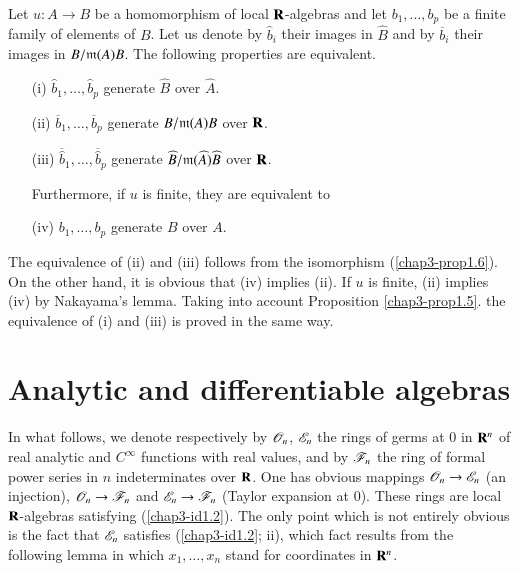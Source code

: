 \begin{corollary}\label{chap3-coro1.8}
Let $u:A\to B$ be a homomorphism of local $\mathbf{R}$-algebras and let $b_{1},\ldots,b_{p}$ be a finite family of elements of $B$. Let us denote by $\widehat{b}_{i}$ their images in $\widehat{B}$ and by $\overline{b}_{i}$ their images in $B/\mathfrak{m}(A)B$. The following properties are equivalent.
\begin{itemize}
\item[\rm(i)] $\widehat{b}_{1},\ldots,\widehat{b}_{p}$ generate $\widehat{B}$ over $\widehat{A}$.

\item[\rm(ii)] $\overline{b}_{1},\ldots,\overline{b}_{p}$ generate $B/\mathfrak{m}(A)B$ over $\mathbf{R}$.

\item[\rm(iii)] $\overline{\widehat{b}}_{1},\ldots,\overline{\widehat{b}}_{p}$ generate $\widehat{B}/\mathfrak{m}(\widehat{A})\widehat{B}$ over $\mathbf{R}$.

Furthermore, if $u$ is finite, they are equivalent to

\item[\rm(iv)] $b_{1},\ldots,b_{p}$ generate $B$ over $A$.
\end{itemize}
\end{corollary}

The equivalence of (ii) and (iii) follows from the isomorphism (\ref{chap3-prop1.6}). On the other hand, it is obvious that (iv) implies (ii). If $u$ is finite, (ii) implies (iv) by Nakayama's lemma. Taking into account Proposition \ref{chap3-prop1.5}. the equivalence of (i) and (iii) is proved in the same way.

\section{Analytic and differentiable algebras}\label{chap3-sec2}

In what follows, we denote respectively by $\mathscr{O}_{n}$, $\mathscr{E}_{n}$ the rings of germs at $0$ in $\mathbf{R}^{n}$ of real analytic and $C^{\infty}$ functions with real values, and by $\mathscr{F}_{n}$ the ring of formal power series in $n$ indeterminates over $\mathbf{R}$. One has obvious mappings $\mathscr{O}_{n}\to \mathscr{E}_{n}$ (an injection), $\mathscr{O}_{n}\to \mathscr{F}_{n}$ and $\mathscr{E}_{n}\to \mathscr{F}_{n}$ (Taylor expansion at $0$). These rings are local $\mathbf{R}$-algebras satisfying (\ref{chap3-id1.2}). The only point which is not entirely obvious is the fact that $\mathscr{E}_{n}$ satisfies (\ref{chap3-id1.2}; ii), which fact results from the following lemma in which $x_{1},\ldots,x_{n}$ stand for coordinates in $\mathbf{R}^{n}$.

